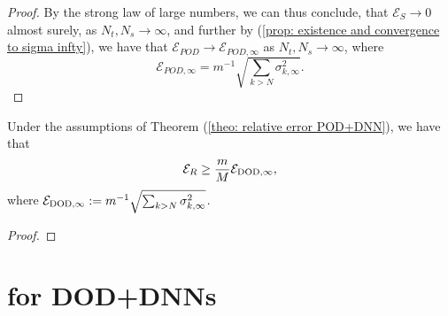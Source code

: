 \begin{proof}
    By the strong law of large numbers, we can thus conclude, that $\mathcal{E}_S \to 0$ almost surely, as $N_t, N_s \to \infty$, and further by (\ref{prop: existence and convergence to sigma infty}), we have that $\mathcal{E}_{POD} \to \mathcal{E}_{POD, \infty}$ as $N_t, N_s \to \infty$, where
    \begin{equation} \label{eq: pod eigenvalues cts case}
        \mathcal{E}_{POD, \infty} = m^{-1} \sqrt{\sum_{k > N} \sigma_{k, \infty}^2}.
    \end{equation}
\end{proof}

\begin{theorem} \label{theo: lower bound on relative error}
    Under the assumptions of Theorem (\ref{theo: relative error POD+DNN}), we have that 
    \begin{equation*}
        \mathcal{E}_R \geq \frac{m}{M} \mathcal{E}_{\text{DOD}, \infty},
    \end{equation*}
    where $\mathcal{E}_{\text{DOD}, \infty} := m^{-1} \sqrt{\sum_{k > N} \sigma_{k, \infty}^2}$.
\end{theorem}
\begin{proof}
\end{proof}

\section{for DOD+DNNs}


